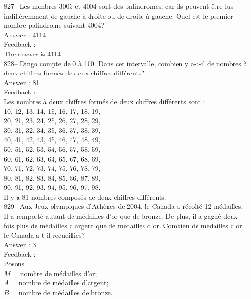 ﻿\documentclass[letterpaper, 12pt]{article}
\begin{document}
827-- Les nombres 3003 et 4004 sont des palindromes, car ils peuvent \^etre
lus indiff\'eremment de gauche \`a droite ou de droite \`a gauche.  Quel est
le premier nombre palindrome suivant 4004?\\

Answer : 4114\\

Feedback :\\
The answer is 4114.\\

828-- Dingo compte de 0 \`a 100.  Dans cet intervalle, combien y a-t-il de
nombres \`a deux chiffres form\'es de deux chiffres diff\'erents?\\

Answer : 81\\

Feedback : \\
Les nombres \`a deux chiffres form\'es de deux chiffres diff\'erents sont :
\\
10, 12, 13, 14, 15, 16, 17, 18, 19, \\
20, 21, 23, 24, 25, 26, 27, 28, 29, \\
30, 31, 32, 34, 35, 36, 37, 38, 39, \\
40, 41, 42, 43, 45, 46, 47, 48, 49, \\
50, 51, 52, 53, 54, 56, 57, 58, 59, \\
60, 61, 62, 63, 64, 65, 67, 68, 69, \\
70, 71, 72, 73, 74, 75, 76, 78, 79, \\
80, 81, 82, 83, 84, 85, 86, 87, 89, \\
90, 91, 92, 93, 94, 95, 96, 97, 98. \\

Il y a 81 nombres compos\'es de deux chiffres diff\'erents.\\


829-- Aux Jeux olympiques d'Ath\`enes de 2004, le Canada a r\'ecolt\'e 12
m\'edailles.  Il a remport\'e autant de m\'edailles d'or que de bronze.  De
plus, il a gagn\'e  deux fois plus de m\'edailles d'argent que de
m\'edailles d'or.  Combien de m\'edailles d'or le Canada a-t-il
recueillies?\\

Answer : 3\\

Feedback : \\
Posons\\
$M$ = nombre de m\'edailles d'or;\\
$A$ = nombre de m\'edailles d'argent;\\
$B$ = nombre de m\'edailles de bronze.\\
\end{document}
